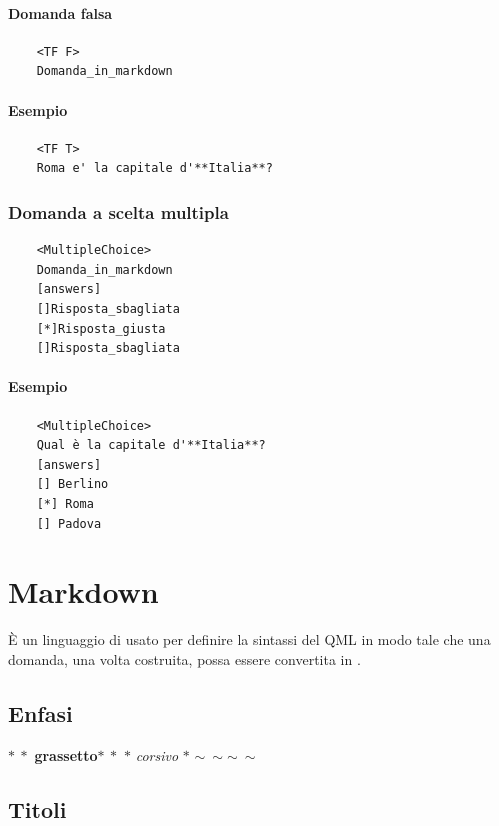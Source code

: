 \documentclass[12pt,a4paper]{article}
\begin{document}
	\paragraph{Domanda falsa}
	\begin{verbatim}
	<TF F>
	Domanda_in_markdown
	\end{verbatim}
	\paragraph{Esempio}
	\begin{verbatim}
	<TF T>
	Roma e' la capitale d'**Italia**?
	\end{verbatim}
	
	\subsubsection{Domanda a scelta multipla}
	\begin{verbatim}
	<MultipleChoice>
	Domanda_in_markdown
	[answers]
	[]Risposta_sbagliata
	[*]Risposta_giusta
	[]Risposta_sbagliata
	\end{verbatim}
	\paragraph{Esempio}
	\begin{verbatim}
	<MultipleChoice>
	Qual è la capitale d'**Italia**?
	[answers]
	[] Berlino
	[*] Roma
	[] Padova
	\end{verbatim}

\section{Markdown}

È un linguaggio di  usato per definire la sintassi del QML in modo tale che una domanda, una volta costruita, possa essere convertita in .

\subsection{Enfasi}

$\ast\ \ast$ \textbf{grassetto}$\ast\ \ast$
\newline
$\ast$ \textit{corsivo} $\ast$
\newline
$ \sim\ \sim$$ \sim\ \sim$

\subsection{Titoli}
\end{document}
